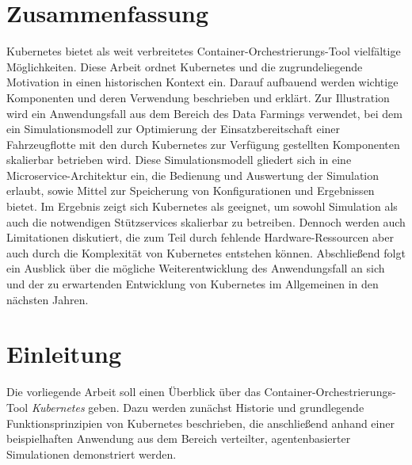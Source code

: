 \documentclass[11pt,a4paper]{article}
\begin{document}
\tableofcontents

\section{Zusammenfassung}
Kubernetes bietet als weit verbreitetes Container-Orchestrierungs-Tool vielfältige Möglichkeiten.
Diese Arbeit ordnet Kubernetes und die zugrundeliegende Motivation in einen historischen Kontext ein. 
Darauf aufbauend werden wichtige Komponenten und deren Verwendung beschrieben und erklärt.
Zur Illustration wird ein Anwendungsfall aus dem Bereich des Data Farmings verwendet, 
bei dem ein Simulationsmodell zur Optimierung der Einsatzbereitschaft einer Fahrzeugflotte mit den 
durch Kubernetes zur Verfügung gestellten Komponenten skalierbar betrieben wird. Diese Simulationsmodell
gliedert sich in eine Microservice-Architektur ein, die Bedienung und Auswertung der Simulation erlaubt, 
sowie Mittel zur Speicherung von Konfigurationen und Ergebnissen bietet.
Im Ergebnis zeigt sich Kubernetes als geeignet, um sowohl Simulation als auch die notwendigen 
Stützservices skalierbar zu betreiben.
Dennoch werden auch Limitationen diskutiert, die zum Teil durch fehlende 
Hardware-Ressourcen aber auch durch die Komplexität von Kubernetes entstehen können.
Abschließend folgt ein Ausblick über die mögliche Weiterentwicklung des Anwendungsfall
an sich und der zu erwartenden Entwicklung von Kubernetes im Allgemeinen in den nächsten Jahren.



\section{Einleitung}
\label{sec:einleitung}
Die vorliegende Arbeit soll einen Überblick über das Container-\linebreak Orchestrierungs-Tool \emph{Kubernetes} geben. 
Dazu werden zunächst Historie und grundlegende Funktionsprinzipien von Kubernetes beschrieben, die anschließend
anhand einer beispielhaften Anwendung aus dem Bereich verteilter, agentenbasierter Simulationen demonstriert werden.
\end{document}
